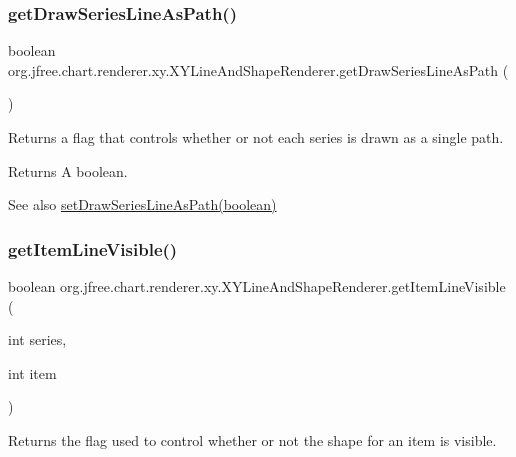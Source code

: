 \subsubsection{\texorpdfstring{get\+Draw\+Series\+Line\+As\+Path()}{getDrawSeriesLineAsPath()}}
{\footnotesize\ttfamily boolean org.\+jfree.\+chart.\+renderer.\+xy.\+X\+Y\+Line\+And\+Shape\+Renderer.\+get\+Draw\+Series\+Line\+As\+Path (\begin{DoxyParamCaption}{ }\end{DoxyParamCaption})}

Returns a flag that controls whether or not each series is drawn as a single path.

\begin{DoxyReturn}{Returns}
A boolean.
\end{DoxyReturn}
\begin{DoxySeeAlso}{See also}
\mbox{\hyperlink{classorg_1_1jfree_1_1chart_1_1renderer_1_1xy_1_1_x_y_line_and_shape_renderer_a55209b5160cfc29ae9e3688812655389}{set\+Draw\+Series\+Line\+As\+Path(boolean)}} 
\end{DoxySeeAlso}
\mbox{\label{classorg_1_1jfree_1_1chart_1_1renderer_1_1xy_1_1_x_y_line_and_shape_renderer_a7c2ceea16ba4b69cded2fd053754befb}} 
\subsubsection{\texorpdfstring{get\+Item\+Line\+Visible()}{getItemLineVisible()}}
{\footnotesize\ttfamily boolean org.\+jfree.\+chart.\+renderer.\+xy.\+X\+Y\+Line\+And\+Shape\+Renderer.\+get\+Item\+Line\+Visible (\begin{DoxyParamCaption}\item[{int}]{series,  }\item[{int}]{item }\end{DoxyParamCaption})}

Returns the flag used to control whether or not the shape for an item is visible.


